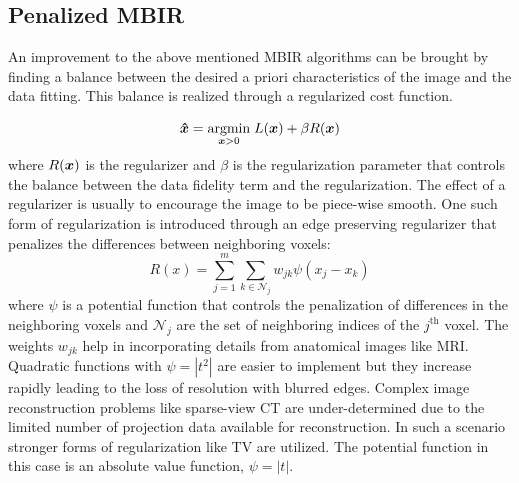 \subsection{Penalized MBIR}
An improvement to the above mentioned \ac{MBIR} algorithms can be brought by finding a balance between the desired a priori characteristics of the image and the data fitting. This balance is realized through a regularized cost function.

\begin{equation}\label{eq:p_mbir}
\bm{\hat{x}}=\underset{\bm{x} > 0}{\operatorname{argmin}} \; L(\bm{x}) + \beta R(\bm{x})
\end{equation}
where $R(\bm{x})$ is the regularizer and $\beta$ is the regularization parameter that controls the balance between the data fidelity term and the regularization. The effect of a regularizer is usually to encourage the image to be piece-wise smooth.  
One such form of regularization is introduced through an edge preserving regularizer that penalizes the differences between neighboring voxels:
\begin{equation}\label{eq:prior}
R(x)=\sum_{j=1}^{m} \sum_{k \in \mathcal{N}_{j}} w_{j k} \psi \left(x_{j}-x_{k}\right)
\end{equation}
where $\psi$ is a potential function that controls the penalization of differences in the neighboring voxels and $\mathcal{N}_{j}$ are the set of neighboring indices of the $j^\mathrm{th}$ voxel. The weights $w_{jk}$ help in incorporating details from anatomical images like MRI. Quadratic functions with $\psi = |t^2|$ are easier to implement but they increase rapidly leading to the loss of resolution with blurred edges. Complex image reconstruction problems like sparse-view \ac{CT} are under-determined due to the limited number of projection data available for reconstruction. In such a scenario stronger forms of regularization like \ac{TV} are utilized. The potential function in this case is an absolute value function, $\psi = |t|$. 

